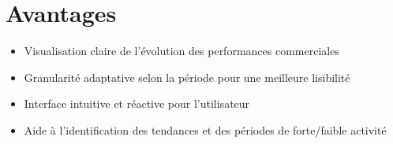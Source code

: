 \documentclass[12pt,a4paper]{article}
\begin{document}
\section{Avantages}
\begin{itemize}
    \item Visualisation claire de l'évolution des performances commerciales
    \item Granularité adaptative selon la période pour une meilleure lisibilité
    \item Interface intuitive et réactive pour l'utilisateur
    \item Aide à l'identification des tendances et des périodes de forte/faible activité
\end{itemize}
\end{document}
